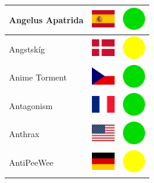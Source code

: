 \documentclass[12pt, a4paper, twoside]{report}
\begin{document}
\begin{center}
\begin{longtable}{|p{5cm}|p{2cm}|p{2cm}|}
 Angelus Apatrida                                           & \includegraphics[width=1cm]{../4x3/es} &   \includegraphics[width=1cm]{../likes/y} \\ \hline
 Angstskíg                                                  & \includegraphics[width=1cm]{../4x3/dk} &   \includegraphics[width=1cm]{../likes/m} \\ \hline
 Anime Torment                                              & \includegraphics[width=1cm]{../4x3/cz} &   \includegraphics[width=1cm]{../likes/y} \\ \hline
 Antagonism                                                 & \includegraphics[width=1cm]{../4x3/fr} &   \includegraphics[width=1cm]{../likes/y} \\ \hline
 Anthrax                                                    & \includegraphics[width=1cm]{../4x3/us} &   \includegraphics[width=1cm]{../likes/y} \\ \hline
 AntiPeeWee                                                 & \includegraphics[width=1cm]{../4x3/de} &   \includegraphics[width=1cm]{../likes/m} \\ \hline

\end{longtable}
\end{center}
\end{document}
